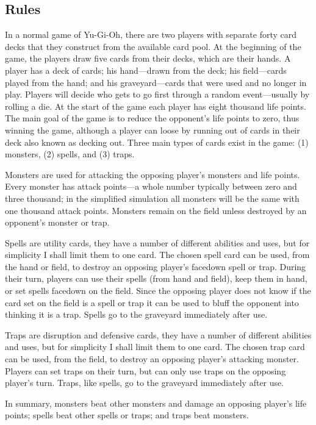 
\subsection{Rules}
In a normal game of Yu-Gi-Oh, there are two players with separate forty card decks that they construct from the available card pool. At the beginning of the game, the players draw five cards from their decks, which are their hands. A player has a deck of cards; his hand---drawn from the deck; his field---cards played from the hand; and his graveyard---cards that were used and no longer in play. Players will decide who gets to go first through a random event---usually by rolling a die. At the start of the game each player has eight thousand life points. The main goal of the game is to reduce the opponent's life points to zero, thus winning the game, although a player can loose by running out of cards in their deck also known as decking out. Three main types of cards exist in the game: (1) monsters, (2) spells, and (3) traps. 

Monsters are used for attacking the opposing player's monsters and life points. Every monster has attack points---a whole number typically between zero and three thousand; in the simplified simulation all monsters will be the same with one thousand attack points. Monsters remain on the field unless destroyed by an opponent's monster or trap.

Spells are utility cards, they have a number of different abilities and uses, but for simplicity I shall limit them to one card. The chosen spell card can be used, from the hand or field, to destroy an opposing player's facedown spell or trap. During their turn, players can use their spells (from hand and field), keep them in hand, or set spells facedown on the field. Since the opposing player does not know if the card set on the field is a spell or trap it can be used to bluff the opponent into thinking it is a trap. Spells go to the graveyard immediately after use.  

Traps are disruption and defensive cards, they have a number of different abilities and uses, but for simplicity I shall limit them to one card. The chosen trap card can be used, from the field, to destroy an opposing player's attacking monster. Players can set traps on their turn, but can only use traps on the opposing player's turn. Traps, like spells, go to the graveyard immediately after use. 

In summary, monsters beat other monsters and damage an opposing player's life points; spells beat other spells or traps; and traps beat monsters.

